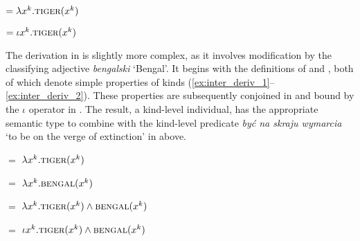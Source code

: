 \documentclass[output=paper]{langscibook}
\begin{document}
\ea \label{ex:def_deriv}

\ea {} $= \lambda x^k.\textsc{tiger}(x^k)$
\label{ex:def_deriv_1}

\ex {} $= \iota x^k.\textsc{tiger}(x^k)$
\label{ex:def_deriv_2}
\z \z

\begin{sloppypar}
\noindent
The derivation in  is slightly more complex, as it involves modification by the classifying adjective \textit{bengalski} `Bengal'. It begins with the definitions of  and , both of which denote simple properties of kinds (\ref{ex:inter_deriv_1}--\ref{ex:inter_deriv_2}). These properties are subsequently conjoined in  and bound by the $\iota$ operator in . The result, a kind-level individual, has the appropriate semantic type to combine with the kind-level predicate \textit{być na skraju wymarcia} `to be on the verge of extinction' in  above.
\end{sloppypar}

\ea \label{ex:inter_deriv}

\ea {} $=$  $\lambda x^k.\textsc{tiger}(x^k)$
\label{ex:inter_deriv_1}

\ex {} $=$  $\lambda x^k.\textsc{bengal}(x^k)$
\label{ex:inter_deriv_2}

\ex {} $=$ $\lambda x^k.\textsc{tiger}(x^k) \wedge \textsc{bengal}(x^k)$
\label{ex:inter_deriv_3}

\ex {} $=$ $\iota x^k.\textsc{tiger}(x^k) \wedge \textsc{bengal}(x^k)$
\label{ex:inter_deriv_4}
\z \z
\end{document}
